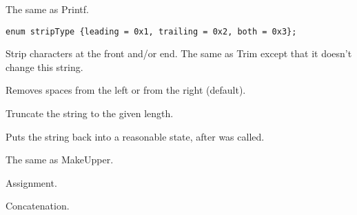 The same as Printf.

\label{wxstringStrip}

\begin{verbatim}
enum stripType {leading = 0x1, trailing = 0x2, both = 0x3};
\end{verbatim}


Strip characters at the front and/or end. The same as Trim except that it
doesn't change this string.

\label{wxstringtrim}


Removes spaces from the left or from the right (default).

\label{wxstringtruncate}


Truncate the string to the given length.

\label{wxstringungetwritebuf}


Puts the string back into a reasonable state, after
\rtfsp{} was called.

\label{wxstringUpperCase}


The same as MakeUpper.

\label{wxstringoperatorassign}






Assignment.

\label{wxstringoperatorplus}

Concatenation.


